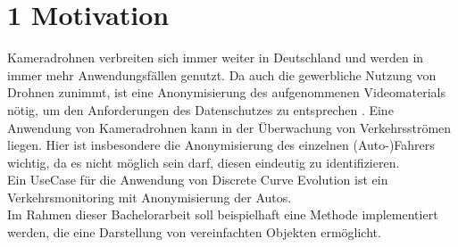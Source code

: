\documentclass[a4paper,11pt,pdftex, parskip]{scrreprt}
\begin{document}
\section*{1 Motivation}
Kameradrohnen verbreiten sich immer weiter in Deutschland und werden in immer mehr Anwendungsfällen genutzt. Da auch die gewerbliche Nutzung von Drohnen zunimmt, ist eine Anonymisierung des aufgenommenen Videomaterials nötig, um den Anforderungen des Datenschutzes zu entsprechen \citep{Nehring2021}.
Eine Anwendung von Kameradrohnen kann in der Überwachung von Verkehrsströmen liegen. Hier ist insbesondere die Anonymisierung des einzelnen (Auto-)Fahrers wichtig, da es nicht möglich sein darf, diesen eindeutig zu identifizieren. \\
Ein UseCase für die Anwendung von Discrete Curve Evolution ist ein Verkehrsmonitoring mit Anonymisierung der Autos. \\
Im Rahmen dieser Bachelorarbeit soll beispielhaft eine Methode implementiert werden, die eine Darstellung von vereinfachten Objekten ermöglicht.
\end{document}
